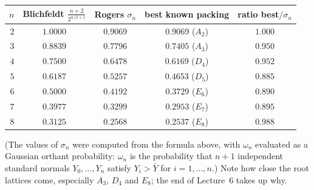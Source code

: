 \documentclass[11pt,openany]{book}
\theoremstyle{plain}
\theoremstyle{definition}
\theoremstyle{remark}
\begin{document}
\begin{center}
\renewcommand{\arraystretch}{1.15}
\begin{tabular}{rcccc}
\toprule
$n$ & Blichfeldt $\frac{n+2}{2^{n/2+1}}$ & Rogers $\sigma_n$ & best known packing & ratio best$/\sigma_n$\\
\midrule
$2$ & $1.0000$ & $0.9069$ & $0.9069$ ($A_2$) & $1.000$\\
$3$ & $0.8839$ & $0.7796$ & $0.7405$ ($A_3$) & $0.950$\\
$4$ & $0.7500$ & $0.6478$ & $0.6169$ ($D_4$) & $0.952$\\
$5$ & $0.6187$ & $0.5257$ & $0.4653$ ($D_5$) & $0.885$\\
$6$ & $0.5000$ & $0.4192$ & $0.3729$ ($E_6$) & $0.890$\\
$7$ & $0.3977$ & $0.3299$ & $0.2953$ ($E_7$) & $0.895$\\
$8$ & $0.3125$ & $0.2568$ & $0.2537$ ($E_8$) & $0.988$\\
\bottomrule
\end{tabular}
\end{center}
(The values of $\sigma_n$ were computed from the formula above, with $\omega_n$ evaluated as a Gaussian
orthant probability: $\omega_n$ is the probability that $n+1$ independent standard normals $Y_0,\dots,Y_n$
satisfy $Y_i>\bar Y$ for $i=1,\dots,n$.) Note how close the root lattices come, especially $A_3$, $D_4$ and $E_8$; the end
of Lecture~6 takes up why.
\end{document}
